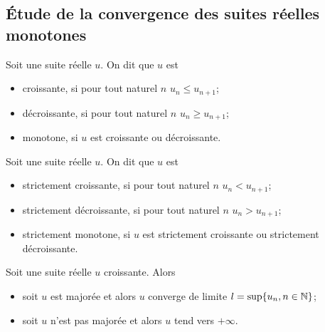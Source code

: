 \subsection{Étude de la convergence des suites réelles monotones}

\begin{defdef}
  Soit une suite réelle \(u\). On dit que \(u\) est
  \begin{itemize}
  \item croissante, si pour tout naturel \(n\) \(u_n \leqslant u_{n+1}\);
  \item décroissante, si pour tout naturel \(n\) \(u_n \geqslant u_{n+1}\);
  \item monotone, si \(u\) est croissante ou décroissante.
  \end{itemize}
\end{defdef}
\begin{defdef}
  Soit une suite réelle \(u\). On dit que \(u\) est
  \begin{itemize}
  \item strictement croissante, si pour tout naturel \(n\) \(u_n < u_{n+1}\);
  \item strictement décroissante, si pour tout naturel \(n\) \(u_n > u_{n+1}\);
  \item strictement monotone, si \(u\) est strictement croissante ou strictement décroissante.
  \end{itemize}
\end{defdef}
\begin{theo}
  Soit une suite réelle \(u\) croissante. Alors
  \begin{itemize}
  \item soit \(u\) est majorée et alors \(u\) converge de limite \(l = \sup\{u_n, n \in \mathbb{N}\}\);
  \item soit \(u\) n'est pas majorée et alors \(u\) tend vers \(+\infty\).
  \end{itemize}
\end{theo}

